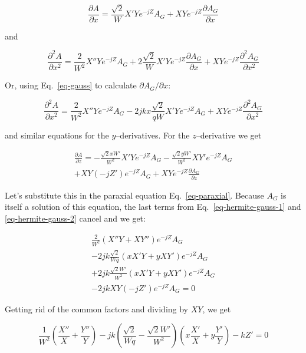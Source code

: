 \begin{equation}
\frac{\partial A}{\partial x} = \frac{\sqrt{2}}{W}X'Ye^{-jZ} A_G + XYe^{-jZ} \frac{\partial A_G}{\partial x} 
\end{equation} 

and

\begin{equation}
\frac{\partial^2 A}{\partial x^2} = \frac{2}{W^2}X''Ye^{-jZ} A_G  + 2\frac{\sqrt{2}}{W}X'Ye^{-jZ} \frac{\partial A_G}{\partial x}  + XYe^{-jZ} \frac{\partial^2 A_G}{\partial x^2}
\end{equation} 

Or, using Eq.~\ref{eq-gauss} to calculate $\partial A_G / \partial x$:

\begin{equation}
\frac{\partial^2 A}{\partial x^2} = \frac{2}{W^2}X''Ye^{-jZ} A_G  - 2j k x \frac{\sqrt{2}}{qW}X'Ye^{-jZ}A_G  + XYe^{-jZ} \frac{\partial^2 A_G}{\partial x^2} \label{eq-hermite-gauss-1}
\end{equation} 

and similar equations for the $y$--derivatives. For the $z$--derivative we get

\begin{align}
\frac{\partial A}{\partial z} =  -\frac{\sqrt{2}x W'}{W^2}X'Ye^{-jZ} A_G -\frac{\sqrt{2}y W'}{W^2}XY'e^{-jZ} A_G \nonumber \\ 
+ XY\left(-jZ'\right)e^{-jZ} A_G + XYe^{-jZ}\frac{\partial A_G}{\partial z} \label{eq-hermite-gauss-2}
\end{align} 

Let's substitute this in the paraxial equation Eq.~\ref{eq-paraxial}. Because $A_G$ is itself a solution of this equation, the last terms from Eq.~\ref{eq-hermite-gauss-1} and \ref{eq-hermite-gauss-2} cancel and we get:

\begin{align}
\frac{2}{W^2}\left(X''Y+XY''\right)e^{-jZ} A_G   \nonumber \\
-2jk \frac{\sqrt{2}}{Wq}\left(xX'Y+yXY'\right)e^{-jZ}A_G \nonumber \\
+2jk \frac{\sqrt{2} W'}{W^2}\left(xX'Y+yXY'\right)e^{-jZ}A_G \nonumber \\
-2jk XY\left(-jZ'\right)e^{-jZ} A_G = 0
\end{align}

Getting rid of the common factors and dividing by $XY$, we get

\begin{equation}
\frac{1}{W^2}\left(\frac{X''}{X}+\frac{Y''}{Y}\right)  
- j k \left(\frac{\sqrt{2}}{Wq} - \frac{\sqrt{2}W'}{W^2}\right)\left(x\frac{X'}{X}+y\frac{Y'}{Y}\right)
-kZ' = 0
\end{equation} 

